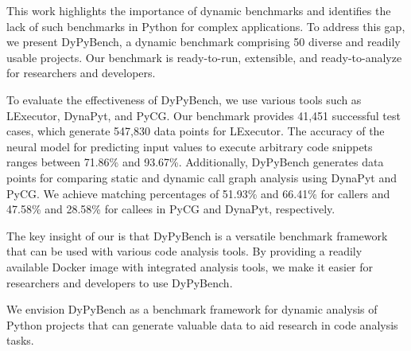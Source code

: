 This work highlights the importance of dynamic benchmarks and identifies the lack of such benchmarks in Python for complex applications.
To address this gap, we present DyPyBench, a dynamic benchmark comprising 50 diverse and readily usable projects.
Our benchmark is ready-to-run, extensible, and ready-to-analyze for researchers and developers.

To evaluate the effectiveness of DyPyBench, we use various tools such as LExecutor, DynaPyt, and PyCG.
Our benchmark provides 41,451 successful test cases, which generate 547,830 data points for LExecutor.
The accuracy of the neural model for predicting input values to execute arbitrary code snippets ranges between 71.86\% and 93.67\%.
Additionally, DyPyBench generates data points for comparing static and dynamic call graph analysis using DynaPyt and PyCG.
We achieve matching percentages of 51.93\% and 66.41\% for callers and 47.58\% and 28.58\% for callees in PyCG and DynaPyt, respectively.

The key insight of our is that DyPyBench is a versatile benchmark framework that can be used with various code analysis tools.
By providing a readily available Docker image with integrated analysis tools, we make it easier for researchers and developers to use DyPyBench.

We envision DyPyBench as a benchmark framework for dynamic analysis of Python projects that can generate valuable data to aid research in code analysis tasks.